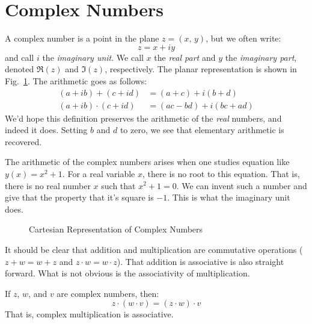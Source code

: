 \section{Complex Numbers}
    A \gls{complex number} is a point in the plane $z=(x,\,y)$, but we often
    write:
    \begin{equation}
        z=x+iy
    \end{equation}
    and call $i$ the \textit{imaginary unit}. We call $x$ the \textit{real part}
    and $y$ the \textit{imaginary part}, denoted $\Re(z)$ and $\Im(z)$,
    respectively. The planar representation is shown in
    Fig.~\ref{fig:Cart_Rep_of_Comp_Num}. The arithmetic goes as follows:
    \begin{subequations}
        \begin{align}
            \label{eqn:Complex_Addition}%
            (a+ib)+(c+id)&=(a+c)+i(b+d)\\
            \label{eqn:Complex_Multiplication}%
            (a+ib)\cdot(c+id)&=(ac-bd)+i(bc+ad)
        \end{align}
    \end{subequations}
    We'd hope this definition preserves the arithmetic of the \textit{real}
    numbers, and indeed it does. Setting $b$ and $d$ to zero, we see that
    elementary arithmetic is recovered.
    \par\hfill\par
    The arithmetic of the complex numbers arises when one studies equation
    like $y(x)=x^{2}+1$. For a real variable $x$, there is no root to this
    equation. That is, there is no real number $x$ such that $x^{2}+1=0$.
    We can invent such a number and give that the property that it's square
    is $\minus{1}$. This is what the imaginary unit does.
    \begin{figure}[H]
        \centering
        \captionsetup{type=figure}
        
        \caption{Cartesian Representation of Complex Numbers}
        \label{fig:Cart_Rep_of_Comp_Num}
    \end{figure}
    It should be clear  that addition and multiplication are commutative
    operations ($z+w=w+z$ and $z\cdot{w}=w\cdot{z}$). That addition is
    associative is also straight forward. What is not obvious is the
    associativity of multiplication.
    \begin{theorem}
        \label{thm:Complex_Multiplication_Associative}%
        If $z$, $w$, and $v$ are complex numbers, then:
        \begin{equation}
            z\cdot(w\cdot{v})=(z\cdot{w})\cdot{v}
        \end{equation}
        That is, complex multiplication is associative.
    \end{theorem}
